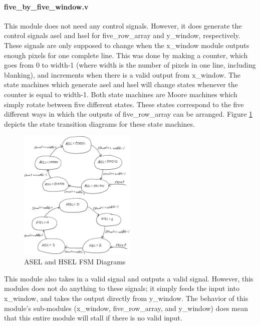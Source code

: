 \paragraph{five\_by\_five\_window.v}
This module does not need any control signals. However, it does generate the 
control signals asel and hsel for five\_row\_array and y\_window, respectively. 
These signals are only supposed to change when the x\_window module outputs 
enough pixels for one complete line. This was done by making a counter, which 
goes from 0 to width-1 (where width is the number of pixels in one line, 
including blanking), and increments when there is a valid output from x\_window. 
The state machines which generate asel and hsel will change states whenever the 
counter is equal to width-1. Both state machines are Moore machines which simply 
rotate between five different states. These states correspond to the five 
different ways in which the outputs of five\_row\_array can be arranged. Figure 
\ref{fig:sel_states} depicts the state transition diagrams for these state machines.

\begin{figure}
    \includegraphics[width=0.5\textwidth]{processed_image_pngs/sel_states.png}
    \caption{ASEL and HSEL FSM Diagrams}
    \label{fig:sel_states}
\end{figure}



This module also takes in a valid signal and outputs a valid signal. However, 
this modules does not do anything to these signals; it simply feeds the input 
into x\_window, and takes the output directly from y\_window. The behavior of this 
module's sub-modules (x\_window, five\_row\_array, and y\_window) does mean that 
this entire module will stall if there is no valid input.

